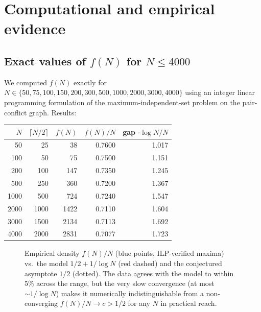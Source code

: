 \documentclass[11pt]{amsart}
\theoremstyle{plain}
\theoremstyle{definition}
\begin{document}
\section{Computational and empirical evidence}\label{sec:computation}

\subsection{Exact values of $f(N)$ for $N \leq 4000$}

We computed $f(N)$ exactly for $N \in \{50, 75, 100, 150, 200, 300, 500, 1000, 2000, 3000, 4000\}$ using an integer linear programming formulation of the maximum-independent-set problem on the pair-conflict graph. Results:

\begin{center}
\begin{tabular}{r|r|r|r|r}
$N$ & $\lceil N/2 \rceil$ & $f(N)$ & $f(N)/N$ & gap $\cdot \log N / N$ \\
\hline
50   & 25   & 38   & 0.7600 & 1.017 \\
100  & 50   & 75   & 0.7500 & 1.151 \\
200  & 100  & 147  & 0.7350 & 1.245 \\
500  & 250  & 360  & 0.7200 & 1.367 \\
1000 & 500  & 724  & 0.7240 & 1.547 \\
2000 & 1000 & 1422 & 0.7110 & 1.604 \\
3000 & 1500 & 2134 & 0.7113 & 1.692 \\
4000 & 2000 & 2831 & 0.7077 & 1.723 \\
\end{tabular}
\end{center}

\begin{figure}[h!]
\centering
{}
\caption{Empirical density $f(N)/N$ (blue points, ILP-verified maxima) vs.\ the model $1/2 + 1/\log N$ (red dashed) and the conjectured asymptote $1/2$ (dotted). The data agrees with the model to within $5\%$ across the range, but the very slow convergence (at most $\sim 1/\log N$) makes it numerically indistinguishable from a non-converging $f(N)/N \to c > 1/2$ for any $N$ in practical reach.}
\label{fig:density-plot}
\end{figure}
\end{document}
